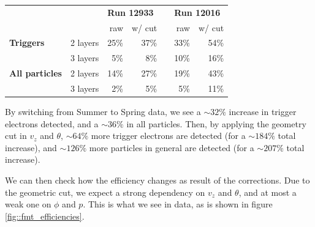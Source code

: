         \begin{center}
            \begin{tabularx}{0.70\textwidth}{Xr|rrcrr}
                & & \multicolumn{2}{l}{\textbf{Run 12933}}        & & \multicolumn{2}{l}{\textbf{Run 12016}} \\
                                       &          & raw  & w/ cut & & raw  & w/ cut \\
                \hline
                \textbf{Triggers}      & 2 layers & 25\% & 37\%   & & 33\% & 54\%   \\
                                       & 3 layers &  5\% &  8\%   & & 10\% & 16\%   \\
                \hline
                \textbf{All particles} & 2 layers & 14\% & 27\%   & & 19\% & 43\%   \\
                                       & 3 layers &  2\% &  5\%   & &  5\% & 11\%
            \end{tabularx}
            \label{tab::fmt_efficiency_study}
        \end{center}

        By switching from Summer to Spring data, we see a $\sim32\%$ increase in trigger electrons detected, and a $\sim36\%$ in all particles.
        Then, by applying the geometry cut in $v_z$ and $\theta$, $\sim64\%$ more trigger electrons are detected (for a $\sim184\%$ total increase), and $\sim126\%$ more particles in general are detected (for a $\sim207\%$ total increase).

        We can then check how the efficiency changes as result of the corrections.
        Due to the geometric cut, we expect a strong dependency on $v_z$ and $\theta$, and at most a weak one on $\phi$ and $p$.
        This is what we see in data, as is shown in figure \ref{fig::fmt_efficiencies}.


